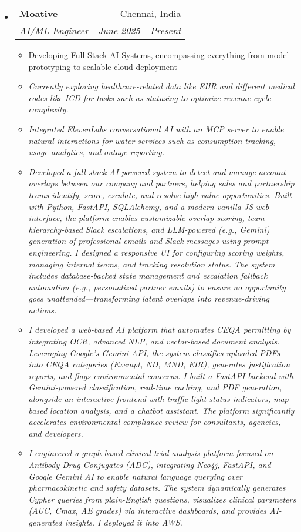 \documentclass[letterpaper,11pt]{article}
\makeatletter
\newcommand{\resitem}[1]{\item #1 \vspace{-2pt}}
\newcommand{\resheading}[1]{\textbf{\sffamily{\mbox{~}{\large #1} \vphantom{p\^{E}}}}}
\newcommand{\ressubheading}[4]{
\begin{tabular*}{6.5in}{l@{\extracolsep{\fill}}r}
    \textbf{#1} & #2 \\
    \textit{#3} & \textit{#4} \\
\end{tabular*}\vspace{-4pt}} %
\makeatother
\begin{document}
\vspace{2mm}
\resheading{Work Experience}
\begin{itemize}
\item[]
    \ressubheading{Moative}{Chennai, India}{AI/ML Engineer}{June 2025 - Present}
    \begin{itemize}
        \resitem{Developing Full Stack AI Systems, encompassing everything from model prototyping to scalable cloud deployment}
        \resitem{\textit{Currently exploring healthcare-related data like EHR and different medical codes like ICD for tasks such as statusing to optimize revenue cycle complexity.}}
        \resitem{\textit{Integrated ElevenLabs conversational AI with an MCP server to enable natural interactions for water services such as consumption tracking, usage analytics, and outage reporting.}}
        \resitem{\textit{Developed a full-stack AI-powered system to detect and manage account overlaps between our company and partners, helping sales and partnership teams identify, score, escalate, and resolve high-value opportunities. Built with Python, FastAPI, SQLAlchemy, and a modern vanilla JS web interface, the platform enables customizable overlap scoring, team hierarchy-based Slack escalations, and LLM-powered (e.g., Gemini) generation of professional emails and Slack messages using prompt engineering. I designed a responsive UI for configuring scoring weights, managing internal teams, and tracking resolution status. The system includes database-backed state management and escalation fallback automation (e.g., personalized partner emails) to ensure no opportunity goes unattended—transforming latent overlaps into revenue-driving actions.}}
	\resitem{\textit{I developed a web-based AI platform that automates CEQA permitting by integrating OCR, advanced NLP, and vector-based document analysis. Leveraging Google's Gemini API, the system classifies uploaded PDFs into CEQA categories (Exempt, ND, MND, EIR), generates justification reports, and flags environmental concerns. I built a FastAPI backend with Gemini-powered classification, real-time caching, and PDF generation, alongside an interactive frontend with traffic-light status indicators, map-based location analysis, and a chatbot assistant. The platform significantly accelerates environmental compliance review for consultants, agencies, and developers.}}
	\resitem{\textit{I engineered a graph-based clinical trial analysis platform focused on Antibody-Drug Conjugates (ADC), integrating Neo4j, FastAPI, and Google Gemini AI to enable natural language querying over pharmacokinetic and safety datasets. The system dynamically generates Cypher queries from plain-English questions, visualizes clinical parameters (AUC, Cmax, AE grades) via interactive dashboards, and provides AI-generated insights. I deployed it into AWS.}}

\end{itemize}
\end{itemize}
\end{document}
